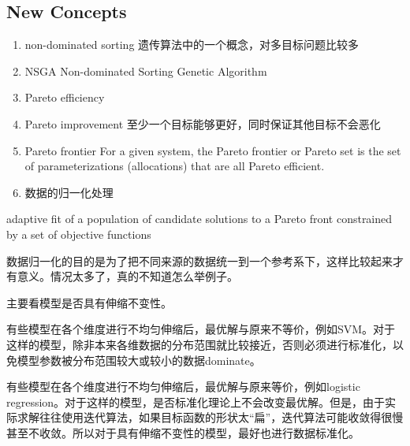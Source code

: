 \documentclass[
10pt, %
a4paper, %
onecolumn, %
portrait %
]{article}
\begin{document}
\begin{CJK*}{UTF8}{gbsn}
\pagestyle{myheadings} %
\markright{\doctitle} %


\thispagestyle{plain} %

\printtitle %


\section{New Concepts} %

\begin{enumerate}
\item  non-dominated sorting 遗传算法中的一个概念，对多目标问题比较多  
\item  NSGA Non-dominated Sorting Genetic Algorithm
\item  Pareto efficiency
\item Pareto improvement 至少一个目标能够更好，同时保证其他目标不会恶化
\item Pareto frontier For a given system, the Pareto frontier or Pareto set is the set of parameterizations (allocations) that are all Pareto efficient. 
\item 数据的归一化处理
\end{enumerate}

 adaptive fit of a population of candidate solutions to a Pareto front constrained by a set of objective functions

数据归一化的目的是为了把不同来源的数据统一到一个参考系下，这样比较起来才有意义。情况太多了，真的不知道怎么举例子。 

主要看模型是否具有伸缩不变性。

有些模型在各个维度进行不均匀伸缩后，最优解与原来不等价，例如SVM。对于这样的模型，除非本来各维数据的分布范围就比较接近，否则必须进行标准化，以免模型参数被分布范围较大或较小的数据dominate。

有些模型在各个维度进行不均匀伸缩后，最优解与原来等价，例如logistic regression。对于这样的模型，是否标准化理论上不会改变最优解。但是，由于实际求解往往使用迭代算法，如果目标函数的形状太“扁”，迭代算法可能收敛得很慢甚至不收敛。所以对于具有伸缩不变性的模型，最好也进行数据标准化。 



\end{CJK*}
\end{document}
